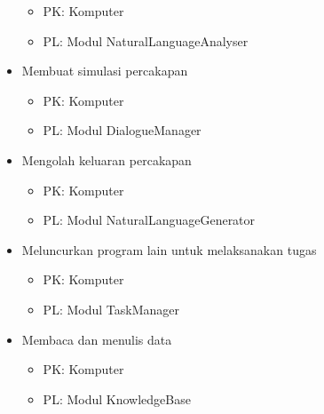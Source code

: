 \begin{itemize}
	\begin{itemize}
	\item PK: Komputer
	\item PL: Modul NaturalLanguageAnalyser
	\end{itemize}
\item Membuat simulasi percakapan
	\begin{itemize}
	\item PK: Komputer
	\item PL: Modul DialogueManager
	\end{itemize}
\item Mengolah keluaran percakapan
	\begin{itemize}
	\item PK: Komputer
	\item PL: Modul NaturalLanguageGenerator
	\end{itemize}
\item Meluncurkan program lain untuk melaksanakan tugas
	\begin{itemize}
	\item PK: Komputer
	\item PL: Modul TaskManager
	\end{itemize}
\item Membaca dan menulis data
	\begin{itemize}
	\item PK: Komputer
	\item PL: Modul KnowledgeBase
	\end{itemize}
\end{itemize}
